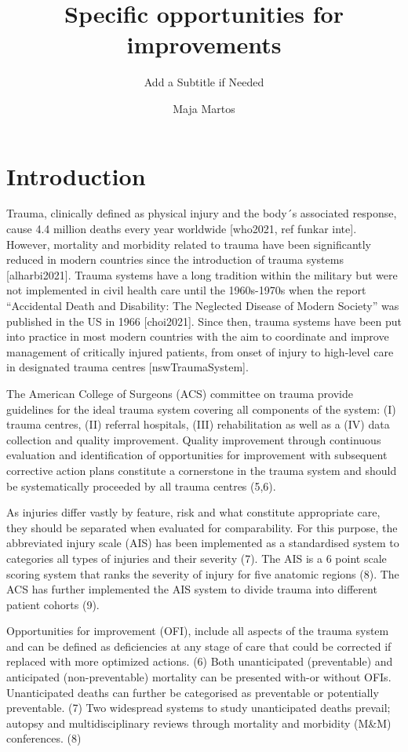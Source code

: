 \documentclass[
]{article}
\title{Specific opportunities for improvements}
\subtitle{Add a Subtitle if Needed}
\author{Maja Martos}
\date{}
\begin{document}
\maketitle

\hypertarget{introduction}{%
\section{Introduction}\label{introduction}}

Trauma, clinically defined as physical injury and the body´s associated
response, cause 4.4 million deaths every year worldwide {[}who2021, ref
funkar inte{]}. However, mortality and morbidity related to trauma have
been significantly reduced in modern countries since the introduction of
trauma systems {[}alharbi2021{]}. Trauma systems have a long tradition
within the military but were not implemented in civil health care until
the 1960s-1970s when the report ``Accidental Death and Disability: The
Neglected Disease of Modern Society'' was published in the US in 1966
{[}choi2021{]}. Since then, trauma systems have been put into practice
in most modern countries with the aim to coordinate and improve
management of critically injured patients, from onset of injury to
high-level care in designated trauma centres {[}nswTraumaSystem{]}.

The American College of Surgeons (ACS) committee on trauma provide
guidelines for the ideal trauma system covering all components of the
system: (I) trauma centres, (II) referral hospitals, (III)
rehabilitation as well as a (IV) data collection and quality
improvement. Quality improvement through continuous evaluation and
identification of opportunities for improvement with subsequent
corrective action plans constitute a cornerstone in the trauma system
and should be systematically proceeded by all trauma centres (5,6).

As injuries differ vastly by feature, risk and what constitute
appropriate care, they should be separated when evaluated for
comparability. For this purpose, the abbreviated injury scale (AIS) has
been implemented as a standardised system to categories all types of
injuries and their severity (7). The AIS is a 6 point scale scoring
system that ranks the severity of injury for five anatomic regions (8).
The ACS has further implemented the AIS system to divide trauma into
different patient cohorts (9).

Opportunities for improvement (OFI), include all aspects of the trauma
system and can be defined as deficiencies at any stage of care that
could be corrected if replaced with more optimized actions. (6) Both
unanticipated (preventable) and anticipated (non-preventable) mortality
can be presented with-or without OFIs. Unanticipated deaths can further
be categorised as preventable or potentially preventable. (7) Two
widespread systems to study unanticipated deaths prevail; autopsy and
multidisciplinary reviews through mortality and morbidity (M\&M)
conferences. (8)
\end{document}
